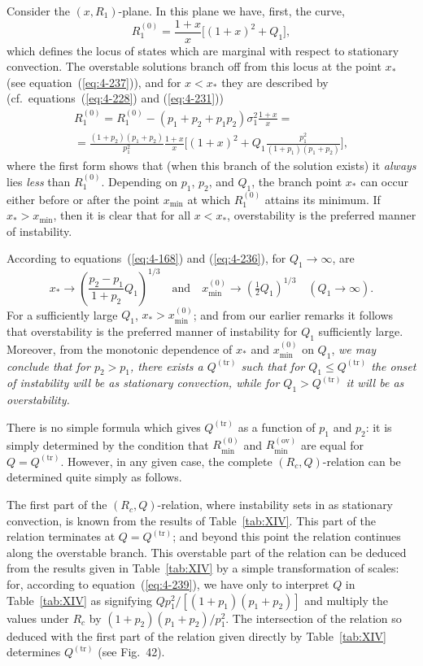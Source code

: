 Consider the $(x, R_1)$-plane. In this plane we have, first, the curve,
\begin{equation}
\label{eq:4-238}
R_1^{(0)} = \frac{1+x}{x}\bigl[(1+x)^2+Q_1\bigr],
\end{equation}
which defines the locus of states which are marginal with respect to stationary convection. The overstable solutions branch off from this locus at the point $x_*$ (see equation~(\ref{eq:4-237})), and for $x<x_*$ they are described by (cf.\ equations~(\ref{eq:4-228}) and (\ref{eq:4-231}))
\begin{multline}
\label{eq:4-239}
R_1^{(0)} = R_1^{(0)}-(p_1+p_2+p_1 p_2)\sigma_1^2\frac{1+x}{x} = {} \\
{} = \frac{(1+p_2)(p_1+p_2)}{p_1^2}\frac{1+x}{x}\bigl[(1+x)^2+Q_1\frac{p_1^2}{(1+p_1)(p_1+p_2)}\bigr],
\end{multline}
where the first form shows that (when this branch of the solution exists) it \emph{always} lies \emph{less} than $R_1^{(0)}$. Depending on $p_1$, $p_2$, and $Q_1$, the branch point $x_*$ can occur either before or after the point $x_{\min}$ at which $R_1^{(0)}$ attains its minimum. If $x_*>x_{\min}$, then it is clear that for all $x<x_*$, overstability is the preferred manner of instability.

According to equations~(\ref{eq:4-168}) and (\ref{eq:4-236}), for $Q_1\to\infty$, are
\begin{equation}
\label{eq:4-240}
x_* \to \left(\frac{p_2-p_1}{1+p_2}Q_1\right)^{\!1/3} \quad\text{and}\quad x_{\min}^{(0)} \to (\tfrac{1}{2}Q_1)^{1/3} \quad (Q_1\to\infty).
\end{equation}
For a sufficiently large $Q_1$, $x_*>x_{\min}^{(0)}$; and from our earlier remarks it follows that overstability is the preferred manner of instability for $Q_1$ sufficiently large. Moreover, from the monotonic dependence of $x_*$ and $x_{\min}^{(0)}$ on $Q_1$, \emph{we may conclude that for $p_2>p_1$, there exists a $Q^{(\text{tr})}$ such that for $Q_1\leq Q^{(\text{tr})}$ the onset of instability will be as stationary convection, while for $Q_1>Q^{(\text{tr})}$ it will be as overstability.}

There is no simple formula which gives $Q^{(\text{tr})}$ as a function of $p_1$ and $p_2$: it is simply determined by the condition that $R_{\min}^{(0)}$ and $R_{\min}^{(\text{ov})}$ are equal for $Q=Q^{(\text{tr})}$. However, in any given case, the complete $(R_c, Q)$-relation can be determined quite simply as follows.

The first part of the $(R_c, Q)$-relation, where instability sets in as stationary convection, is known from the results of Table~\ref{tab:XIV}. This part of the relation terminates at $Q=Q^{(\text{tr})}$; and beyond this point the relation continues along the overstable branch. This overstable part of the relation can be deduced from the results given in Table~\ref{tab:XIV} by a simple transformation of scales: for, according to equation~(\ref{eq:4-239}), we have only to interpret $Q$ in Table~\ref{tab:XIV} as signifying $Qp_1^2/[(1+p_1)(p_1+p_2)]$ and multiply the values under $R_c$ by $(1+p_2)(p_1+p_2)/p_1^2$. The intersection of the relation so deduced with the first part of the relation given directly by Table~\ref{tab:XIV} determines $Q^{(\text{tr})}$ (see Fig.~42).

